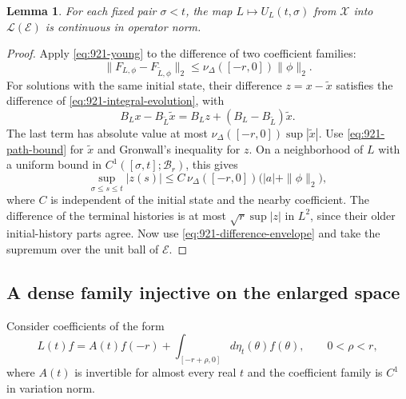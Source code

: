 \documentclass[11pt,a4paper]{article}
\newtheorem{lemma}[theorem]{Lemma}
\theoremstyle{remark}
\begin{document}
\begin{lemma}\label{lem:921-parameter-continuity}
For each fixed pair $\sigma<t$, the map
$L\mapsto U_L(t,\sigma)$ from $\mathcal X$ into
$\mathcal L(\mathcal E)$ is continuous in operator norm.
\end{lemma}
\begin{proof}
Apply \eqref{eq:921-young} to the difference of two coefficient families:
\[
 \|F_{L,\phi}-F_{\widetilde L,\phi}\|_2
 \le\nu_\Delta([-r,0])\|\phi\|_2.
\]
For solutions with the same initial state, their difference $z=x-\widetilde x$
satisfies the difference of \eqref{eq:921-integral-evolution}, with
\[
 B_Lx-B_{\widetilde L}\widetilde x
 =B_Lz+(B_L-B_{\widetilde L})\widetilde x.
\]
The last term has absolute value at most
$\nu_\Delta([-r,0])\sup|\widetilde x|$.
Use \eqref{eq:921-path-bound} for $\widetilde x$ and Gronwall's inequality
for $z$. On a neighborhood of $L$ with a uniform bound in
$C^1([\sigma,t];\mathcal B_r)$, this gives
\[
 \sup_{\sigma\le s\le t}|z(s)|
 \le C\,\nu_\Delta([-r,0])\bigl(|a|+\|\phi\|_2\bigr),
\]
where $C$ is independent of the initial state and the nearby coefficient.
The difference of the terminal histories is at most $\sqrt r\sup|z|$
in $L^2$, since their older initial-history parts agree. Now use
\eqref{eq:921-difference-envelope} and take the supremum over the unit
ball of $\mathcal E$.
\end{proof}

\subsection{A dense family injective on the enlarged space}

Consider coefficients of the form
\[
 L(t)f=A(t)f(-r)+\int_{[-r+\rho,0]}d\eta_t(\theta)f(\theta),
 \qquad 0<\rho<r,
 \tag{921.12}\label{eq:921-gap-family}
\]
where $A(t)$ is invertible for almost every real $t$ and the coefficient
family is $C^1$ in variation norm.
\end{document}
